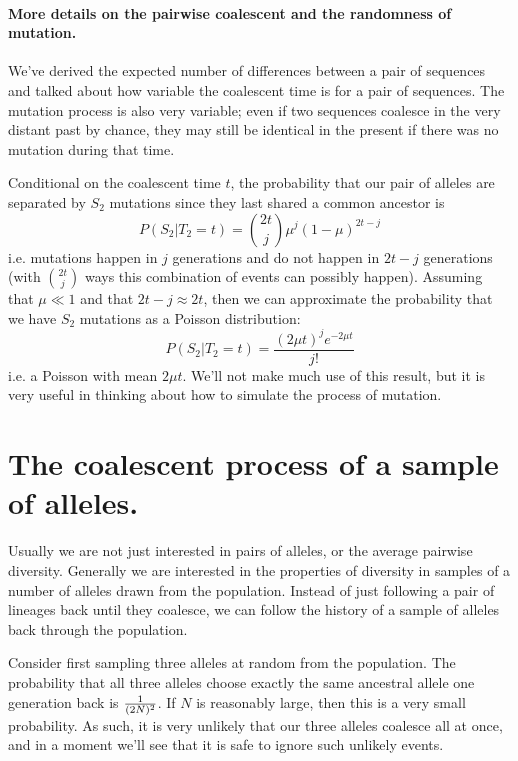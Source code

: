 \paragraph{More details on the pairwise coalescent and the randomness of mutation.}

We've derived the expected number of differences between a pair of sequences and talked about how variable the coalescent time is for a pair of sequences. The mutation process is also very variable; even if two sequences coalesce in the very distant past by chance, they may still be identical in the present if there was no mutation during that time. 

Conditional on the coalescent time $t$, the probability that our pair of alleles are separated by $S_2$ mutations since they last shared a common ancestor is
\begin{equation}
P(S_2 | T_2 = t ) = {2t \choose j} \mu^{j} (1-\mu)^{2t-j}
\end{equation}
i.e. mutations happen in $j$ generations and do not happen in $2t-j$
generations (with ${2t \choose j}$ ways this combination of events can possibly
happen). Assuming that $\mu \ll 1$ and that $2t-j \approx 2t$, then we
can approximate the probability that we have $S_2$ mutations as a
Poisson distribution:
\begin{equation}
P(S_2 | T_2 = t ) = \frac{ (2 \mu t )^{j} e^{-2\mu t}}{j!}
\end{equation}
i.e. a Poisson with mean $2\mu t $. We'll not make much use of this result, but it is very useful in thinking about how to simulate the process of mutation.\\

\section{The coalescent process of a sample of alleles.}

Usually we are not just interested in pairs of alleles, or the
average pairwise diversity. Generally we are interested in the properties of
diversity in samples of a number of alleles drawn from the population.  
Instead of just following a pair of lineages back until they
coalesce, we can follow the history of a sample of alleles back
through the population.

Consider first sampling three alleles at random from the population. The
probability that all three alleles choose exactly the same ancestral allele one
generation back is $\nicefrac{1}{(2N)^2}$. If $N$ is reasonably large, then this
is a very small probability. As such, it is very unlikely that our three alleles
coalesce all at once, and in a moment we'll see that it is safe to ignore such
unlikely events. \\

